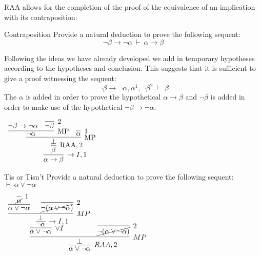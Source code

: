 \documentclass{book}
\begin{document}
    RAA allows for the completion of the proof of the equivalence of an implication with its contraposition: 

    \begin{eg}{Contraposition}
        Provide a natural deduction to prove the following sequent: $$\lnot\beta \to \lnot\alpha \ \vdash \ \alpha \to \beta$$

        Following the ideas we have already developed we add in temporary hypotheses according to the hypotheses and conclusion. This suggests that it is sufficient to give a proof witnessing the sequent: $$\lnot\beta \to \lnot\alpha, \alpha^{1}, \lnot\beta^{2} \ \vdash \ \beta$$ The $\alpha$ is added in order to prove the hypothetical $\alpha\to\beta$ and $\lnot\beta$ is added in order to make use of the hypothetical $\lnot\beta\to\lnot\alpha$. 

        \begin{center}
            $\begin{array}{c}
                \infer[\to I,1]{\alpha \to \beta}
                    {\infer[\RAA,2]{\beta}
                        {\infer[\MP]{\bot}
                            {\infer[\MP]{\lnot\alpha}
                                {\lnot\beta \to \lnot\alpha
                                &
                                \infer[2]{\lnot\beta}
                                    {}}
                            &
                            \infer[1]{\alpha}
                                {}}}}
            \end{array}$
        \end{center}
    \end{eg}    

    \begin{eg}{Tis or Tisn't}
        Provide a natural deduction to prove the following sequent: $ \vdash \ \alpha \lor \lnot \alpha$
        \begin{center}    
            $\begin{array}{c}
                \infer[RAA,2]{\alpha \lor \lnot \alpha}
                    {\infer[MP]{\bot}
                        {\infer[\lor I]{\alpha \lor \lnot \alpha}
                            {\infer[\to I,1]{\lnot \alpha}
                                {\infer[MP]{\bot}
                                    {\infer[]{\alpha \lor \lnot \alpha}{\infer[1]{\cancel{\alpha}}{}}
                                    &
                                    \infer[2]{\cancel{\lnot (\alpha \lor \lnot \alpha)}}{}}}}
                        &
                        \infer[2]{\cancel{\lnot(\alpha \lor \lnot \alpha)}}{}}}
            \end{array}$
        \end{center}
    \end{eg}
\end{document}
